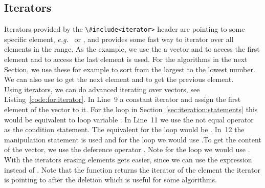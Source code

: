 \subsection{Iterators}
\label{ref:stl:iterators}
Iterators provided by the \lstinline|\#include<iterator>| header are pointing to some specific element, \emph{e.g.}\  or , and provides some fast way to iterator over all elements in the range. As the example, we use the a vector  and to access the first element  and to access the last element  is used. For the algorithms in the next Section, we use these for example to sort  from the largest to the lowest number. We can also use  to get the next element and  to get the previous element.\\

Using iterators, we can do advanced iterating over vectors, see Listing~\ref{code:for:iterator}. In Line~9 a constant iterator  and assign the first element of the vector to it. For the  loop in Section~\ref{sec:iteration:statements} this would be equivalent to loop variable . In Line~11 we use the not equal operator  as the condition statement. The equivalent for the  loop would be . In~12 the manipulation statement  is used and for the  loop we would use .To get the content of the vector, we use the deference operator . Note for the  loop we would use .\\

With the iterators erasing elements gets easier, since we can use the expression  instead of . Note that the  function returns the iterator of the element the iterator is pointing to after the deletion  which is useful for some algorithms.

